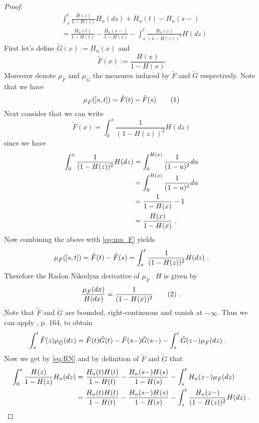 \begin{lemma}
\begin{proof}
		\begin{align*}
		&\int_{s}^{t} \frac{H(z)}{1-H(z)} H_n(dz) + H_n(t) - H_n(s-)\\
		&=\frac{H_n(t)}{1-H(t)} - \frac{H_n(s-)}{1-H(s)} - \int_{s}^{t} \frac{H_n(z)}{(1-H(z))^2} H(dz)
		\end{align*}
		First let's define $\tilde{G}(x):=H_n(x)$ and
		$$\tilde{F}(x) := \frac{H(x)}{1-H(x)}$$
		Moreover denote $\mu_{\tilde F}$ and $\mu_{\tilde G}$ the measures induced by $\tilde F$ and $\tilde G$ respectively. Note that we have
		\begin{equation*}
		\mu_{\tilde F}(]s,t]) =\tilde  F(t) - \tilde F(s)  \numberthis\label{eq:mu_F}
		\end{equation*}
		Next consider that we can write
		$$\tilde F(x) = \int_{0}^{x} \frac{1}{(1-H(z))^2} H(dz)$$ 
		since we have
		\begin{align*}
		\int_{0}^{x} \frac{1}{(1-H(z))^2} H(dz) &= \int_{0}^{H(x)} \frac{1}{(1-u)^2} du\\
		&= \int_{0}^{H(x)} \frac{1}{(1-u)^2} du\\
		&= \frac{1}{1-H(x)} - 1\\
		&= \frac{H(x)}{1-H(x)}\textrm{ .}
		\end{align*}
		Now combining the above with \eqref{eq:mu_F} yields
		\begin{align*}
		\mu_{\tilde F}(]s,t]) = \tilde  F(t) - \tilde F(s)  = \int_{s}^{t} \frac{1}{(1-H(z))^2} H(dz)\textrm{ .}
		\end{align*}	
		Therefore the Radon Nikodym derivative of $\mu_{\tilde F}$ \wrt\ $H$ is given by
		\begin{equation*}
		\frac{\mu_{\tilde F}(dx)}{H(dx)} = \frac{1}{(1-H(x))^2} \numberthis\label{eq:RN}\mdot
		\end{equation*}
		Note that $\tilde{F}$ and $\tilde{G}$ are bounded, right-continuous and vanish at $-\infty$. Thus we can apply \cite{cohn2013measure}, p. 164, to obtain
		\begin{align*}
		\int_{s}^{t} \tilde{F}(z) \mu_{\tilde G}(dz) &=\tilde F(t) \tilde G(t) - \tilde F(s-) \tilde G(s-) - \int_{s}^{t} \tilde G(z-) \mu_{\tilde F}(dz)\textrm{ .}
		\end{align*}
		Now we get by \eqref{eq:RN} and by definition of $\tilde F$ and $\tilde G$ that
		\begin{align*}
		\int_{0}^{s} \frac{H(z)}{1-H(z)} H_n(dz) &=\frac{H_n(t)H(t)}{1-H(t)} - \frac{H_n(s-)H(s)}{1-H(s)} - \int_{s}^{t} H_n(z-) \mu_{\tilde F}(dz)\\
		&=\frac{H_n(t)H(t)}{1-H(t)} - \frac{H_n(s-)H(s)}{1-H(s)} - \int_{s}^{t} \frac{H_n(z-)}{(1-H(z))^2} H(dz)\mdot

\end{align*}
\end{proof}
\end{lemma}
